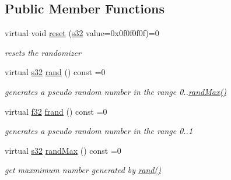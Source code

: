 \subsection*{Public Member Functions}
\begin{DoxyCompactItemize}
\item 
virtual void \hyperlink{classirr_1_1IRandomizer_ac9d7c9464698f6e183992fb895fa5ac4}{reset} (\hyperlink{namespaceirr_ac66849b7a6ed16e30ebede579f9b47c6}{s32} value=0x0f0f0f0f)=0
\begin{DoxyCompactList}\small\item\em resets the randomizer \end{DoxyCompactList}\item 
\mbox{\label{classirr_1_1IRandomizer_a3a31414f525aad0c8815a451340a2729}} 
virtual \hyperlink{namespaceirr_ac66849b7a6ed16e30ebede579f9b47c6}{s32} \hyperlink{classirr_1_1IRandomizer_a3a31414f525aad0c8815a451340a2729}{rand} () const =0
\begin{DoxyCompactList}\small\item\em generates a pseudo random number in the range 0..\hyperlink{classirr_1_1IRandomizer_ac5f1856ac9e8a33bbb5ce1493cc6f351}{rand\+Max()} \end{DoxyCompactList}\item 
\mbox{\label{classirr_1_1IRandomizer_ab48106f4d9f171f31a39c147be2df9d6}} 
virtual \hyperlink{namespaceirr_a0277be98d67dc26ff93b1a6a1d086b07}{f32} \hyperlink{classirr_1_1IRandomizer_ab48106f4d9f171f31a39c147be2df9d6}{frand} () const =0
\begin{DoxyCompactList}\small\item\em generates a pseudo random number in the range 0..1 \end{DoxyCompactList}\item 
\mbox{\label{classirr_1_1IRandomizer_ac5f1856ac9e8a33bbb5ce1493cc6f351}} 
virtual \hyperlink{namespaceirr_ac66849b7a6ed16e30ebede579f9b47c6}{s32} \hyperlink{classirr_1_1IRandomizer_ac5f1856ac9e8a33bbb5ce1493cc6f351}{rand\+Max} () const =0
\begin{DoxyCompactList}\small\item\em get maxmimum number generated by \hyperlink{classirr_1_1IRandomizer_a3a31414f525aad0c8815a451340a2729}{rand()} \end{DoxyCompactList}\item 

\end{DoxyCompactItemize}
